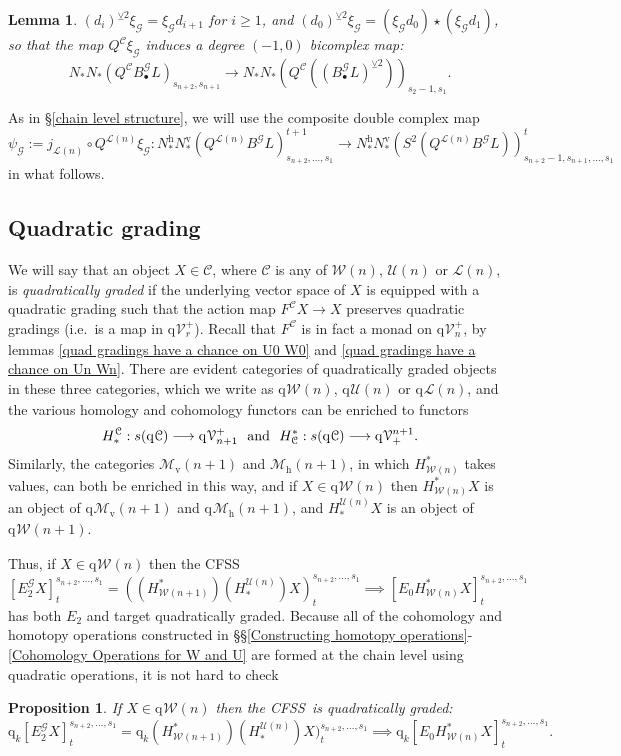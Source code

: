\documentclass[11pt]{amsart} \renewcommand{\baselinestretch}{1.2}
\theoremstyle{plain}
\newtheorem{lem}[thm]{Lemma}
\newtheorem{prop}[thm]{Proposition}
\numberwithin{equation}{section} %
\theoremstyle{plain}
\newtheorem{lem}[thm]{Lemma}
\newtheorem{prop}[thm]{Proposition}
\numberwithin{equation}{chapter} %
\renewcommand{\to}{\longrightarrow}
\newcommand{\scrG}{\mathscr{G}}
\newcommand{\calU}{\mathcal{U}}
\newcommand{\calL}{\mathcal{L}}
\newcommand{\calV}{\mathcal{V}}
\newcommand{\calw}{\mathcal{W}}
\newcommand{\calu}{\mathcal{U}}
\newcommand{\call}{\mathcal{L}}
\newcommand{\calc}{\mathcal{C}}
\newcommand{\calMv}{\mathcal{M}\dver}
\newcommand{\calMh}{\mathcal{M}\dhor}
\newcommand{\vect}[2]{\calV^{#1}_{#2}}
\newcommand{\BSW}{{\scrG}}
\newcommand{\BSWres}{B^\BSW}%
\newcommand{\quadgrad}[1]{\mathrm{q}_{#1}}
\newcommand{\E}[5]{[E^{#1}_{#2}#3]^{#4}_{#5}}
\newcommand{\Edown}[4]{[E_{#1}#2]^{#3}_{#4}}
\newcommand{\uver}{^\mathrm{v}}
\newcommand{\uhor}{^\mathrm{h}}
\newcommand{\dver}{_\mathrm{v}}
\newcommand{\dhor}{_\mathrm{h}}
\newcommand{\smashcoprod}{\veebar}%
\newcommand{\CFSS}{CFSS}
\newcommand{\SubsectionOrSection}[1]{\subsection{#1}}
\begin{document}
\begin{Comp funct sseqs}
\begin{lem}
$(d_i)^{\smashcoprod 2}\xi_\BSW =\xi_\BSW d_{i+1}$ for $i\geq1$, and $(d_0)^{\smashcoprod 2}\xi_\BSW = (\xi_\BSW d_{0})\star(\xi_\BSW d_{1})$, so that the map $Q^{\calc}\xi_\BSW $ induces a degree $(-1,0)$ bicomplex map:
\[N_*N_*(Q^{\calc}B^\BSW_{\bullet}L)_{s_{n+2},s_{n+1}}\to
  N_*N_*(Q^{\calc}((B^\BSW_{\bullet}L)^{\smashcoprod 2}))_{s_2-1,s_1}.\]
\end{lem}
As in \S\ref{chain level structure}, we will use the composite double complex map
\[\psi_\BSW:=j_{\calL(n)}\circ Q^{\calL(n)}\xi_\BSW:N\uhor_*N\uver_*(Q^{\calL(n)}\BSWres L)_{s_{n+2},\ldots,s_1}^{t+1}\to N\uhor_*N\uver_*(S^2(Q^{\calL(n)}\BSWres L))_{s_{n+2}-1,s_{n+1},\ldots,s_1}^{t}\]
in what follows.


\SubsectionOrSection{Quadratic grading}
\label{Quadratic grading}
We will say that an object $X\in\calc$, where $\calc$ is any of $\calw(n)$, $\calu(n)$ or $\call(n)$, is \emph{quadratically graded} if the underlying vector space of $X$ is equipped with a quadratic grading such that the action map
$F^{\calc}X\to X$ 
preserves quadratic gradings (i.e.\ is a map in $\quadgrad{}\vect{+}{r}$).
Recall that $F^{\calc}$ is in fact a monad on $\quadgrad{}\vect{+}{n}$, by lemmas \ref{quad gradings have a chance on U0 W0} and \ref{quad gradings have a chance on Un Wn}. There are evident categories of quadratically graded objects in these three categories, which we write as $\quadgrad{}\calw(n)$, $\quadgrad{}\calu(n)$ or $\quadgrad{}\call(n)$, and the various homology and cohomology functors can be enriched to functors
\[H_*^{\calc}:s(\quadgrad{}\calc)\to \quadgrad{}\vect{+}{n+1}\textup{ \ and \ }H^*_{\calc}:s(\quadgrad{}\calc)\to \quadgrad{}\vect{n+1}{+}.\]
Similarly, the categories $\calMv(n+1)$ and $\calMh(n+1)$, in which $H^*_{\calw(n)}$ takes values, can both be enriched in this way, and if $X\in\quadgrad{}\calw(n)$ then 
$H^*_{\calw(n)}X$ is an object of $\quadgrad{}\calMv(n+1)$ and $\quadgrad{}\calMh(n+1)$, and 
$H_*^{\calu(n)}X$ is an object of $\quadgrad{}\calw(n+1)$.

Thus, if $X\in\quadgrad{}\calw(n)$ then the \CFSS
\[\E{\BSW}{2}{X}{s_{n+2},\ldots,s_1}{t}=((H^*_{\calw(n+1)})(H_*^{\calU(n)})X)^{s_{n+2},\ldots,s_1}_t\implies \Edown{0}{H^*_{\calw(n)}X}{s_{n+2},\ldots,s_1}{t}\]
has both $E_2$ and target quadratically graded. Because all of the cohomology and homotopy operations constructed in \S\S\ref{Constructing homotopy operations}-\ref{Cohomology Operations for W and U} are formed at the chain level using quadratic operations, it is not hard to check
\begin{prop}
\label{prop: cfsseq is quad graded}
If $X\in\quadgrad{}\calw(n)$ then the \CFSS\ is quadratically graded:
\[\quadgrad{k}\E{\BSW}{2}{X}{s_{n+2},\ldots,s_1}{t}=\quadgrad{k}(H^*_{\calw(n+1)})(H_*^{\calU(n)})X)^{s_{n+2},\ldots,s_1}_t\implies \quadgrad{k}\Edown{0}{H^*_{\calw(n)}X}{s_{n+2},\ldots,s_1}{t}.\]
\end{prop}



\end{Comp funct sseqs}
\end{document}
